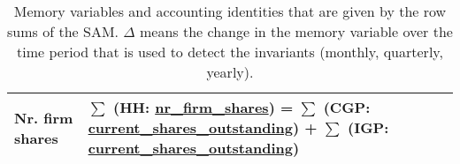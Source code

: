 \begin{landscape}
\begin{table}
\begin{tabular}{|l|l|}
Nr. firm shares   & $\sum$ (HH: \url{nr_firm_shares}) = $\sum$ (CGP: \url{current_shares_outstanding}) + $\sum$ (IGP: \url{current_shares_outstanding})\\
\hline\hline
  \end{tabular}
  \caption{Memory variables and accounting identities that are given by the row sums of the SAM. $\Delta$ means the change in the memory variable over the time period that is used to detect the invariants (monthly, quarterly, yearly).}
  \label{Accounting matrix: Memory variables}
\end{table}
\end{landscape}
